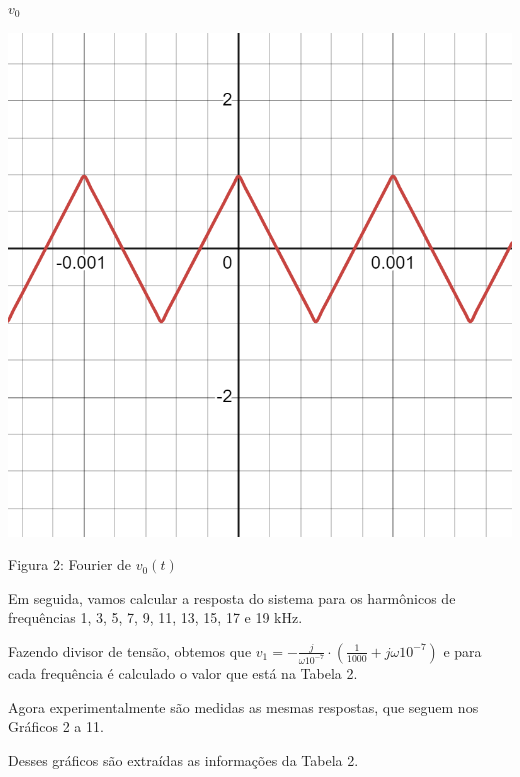 \begin{center}\hspace{-30pt}$v_0$\end{center}
\begin{table}[h]
\centering
\includegraphics[scale=0.4]{figuras/fourier-teorica}
\end{table}\vspace{-6.75cm}\vspace{6.75cm}
\begin{center}
Figura 2: Fourier de $v_0(t)$
\end{center}

Em seguida, vamos calcular a resposta do sistema para os harmônicos de frequências 1, 3, 5, 7, 9, 11, 13, 15, 17 e 19 kHz.

Fazendo divisor de tensão, obtemos que $v_1=-\frac{j}{\omega10^{-7}}\cdot(\frac{1}{1000}+j\omega10^{-7})$ e para cada frequência é calculado o valor que está na Tabela 2.

Agora experimentalmente são medidas as mesmas respostas, que seguem nos Gráficos 2 a 11. 



Desses gráficos são extraídas as informações da Tabela 2.
\newpage



